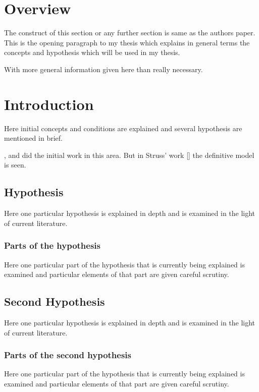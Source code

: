 \documentclass[
  12pt,
  notitlepage]{isuthesis}
\begin{document}
\section{Overview}

The construct of this section or any further section is same as the authors paper.
This is the opening paragraph to my thesis which
explains in general terms the concepts and hypothesis
which will be used in my thesis.

With more general information given here than really
necessary.

\section{Introduction}

Here initial concepts and conditions are explained and
several hypothesis are mentioned in brief.

\cite{allen}, \cite{bruner} and \cite{cox}
did the initial work in this area. But in Struss' work {[}\cite{struss}{]}
the definitive model is seen.

\subsection{Hypothesis}

Here one particular hypothesis is explained in depth
and is examined in the light of current literature.

\subsubsection{Parts of the hypothesis}

Here one particular part of the hypothesis that is
currently being explained is examined and particular
elements of that part are given careful scrutiny.

\subsection{Second Hypothesis}

Here one particular hypothesis is explained in depth
and is examined in the light of current literature.

\subsubsection{Parts of the second hypothesis}

Here one particular part of the hypothesis that is
currently being explained is examined and particular
elements of that part are given careful scrutiny.
\end{document}
